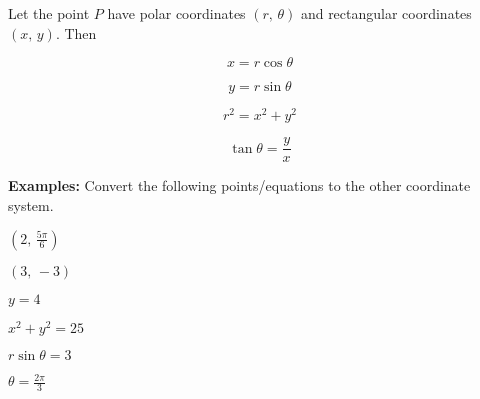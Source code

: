 \begin{tcolorbox}[title= COORDINATE CONVERSION EQUATIONS ,colframe=black,sharp corners,colback=white,colbacktitle=white,coltitle=black]

    

    Let the point $P$ have polar coordinates $(r,\,\theta)$ and rectangular coordinates $(x,\,y)$. Then
    \begin{minipage}[t]{.45\linewidth}
        \[x=r\cos \theta\]
    \end{minipage}
    \hfill
    \begin{minipage}[t]{.45\linewidth}
        \[y=r\sin \theta\]
    \end{minipage}
    
    \begin{minipage}[t]{.45\linewidth}
        \[r^2=x^2+y^2\]
    \end{minipage}
    \hfill
    \begin{minipage}[t]{.45\linewidth}
        \[\tan\theta=\frac{y}{x}\]
    \end{minipage}
    
\end{tcolorbox}
\vspace{.1cm}
\noindent\textbf{Examples:} Convert the following points/equations to the other coordinate system.
\begin{questions}
    \begin{minipage}{.45\linewidth}
        \question $\displaystyle\left(2,\,\frac{5\pi}{6}\right)$
    \end{minipage}
    \hfill
    \begin{minipage}{0.45\linewidth}
        \question $\displaystyle (3,\,-3)$
    \end{minipage}
    
    \newpage
    
    \begin{minipage}{0.45\linewidth}
        \question $y=4$
    \end{minipage}
    \hfill
    \begin{minipage}{0.45\linewidth}
        \question $x^2+y^2=25$
    \end{minipage}
    
    
    \begin{minipage}{0.45\linewidth}
        \question $r\sin\theta=3$
    \end{minipage}
    \hfill
    \begin{minipage}{0.45\linewidth}
        \question $\displaystyle\theta=\frac{2\pi}{3}$
    \end{minipage}

    
\end{questions}

